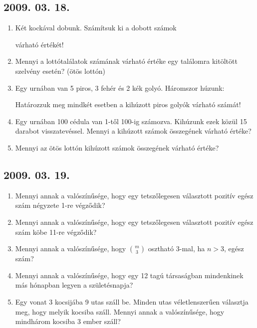 \subsection*{2009. 03. 18.}
\begin{enumerate}
\item Két kockával dobunk. Számítsuk ki a dobott számok 
\quad várható értékét!

\item Mennyi a lottótalálatok számának várható értéke egy találomra kitöltött szelvény esetén? (ötös lottón)

\item Egy urnában van 5 piros, 3 fehér és 2 kék golyó. Háromszor húzunk:
Határozzuk meg mindkét esetben a kihúzott piros golyók várható számát!

\item Egy urnában 100 cédula van 1-től 100-ig számozva. Kihúzunk ezek közül 15 darabot visszatevéssel. Mennyi a kihúzott számok összegének várható értéke?

\item Mennyi az ötös lottón kihúzott számok összegének várható értéke?
\end{enumerate}
\subsection*{2009. 03. 19.}
\begin{enumerate}
\item Mennyi annak a valószínűsége, hogy egy tetszőlegesen választott pozitív egész szám négyzete 1-re végződik?

\item Mennyi annak a valószínűsége, hogy egy tetszőlegesen választott pozitív egész szám köbe 11-re végződik? 

\item Mennyi annak a valószínűsége, hogy $\binom{m}{3}$ osztható 3-mal, ha $n > 3$, egész szám?

\item Mennyi annak a valószínűsége, hogy egy 12 tagú társaságban mindenkinek más hónapban legyen a születésnapja?

\item Egy vonat 3 kocsijába 9 utas száll be. Minden utas véletlenszerűen választja meg, hogy melyik kocsiba száll. Mennyi annak a valószínűsége, hogy mindhárom kocsiba 3 ember száll? 
\end{enumerate}
